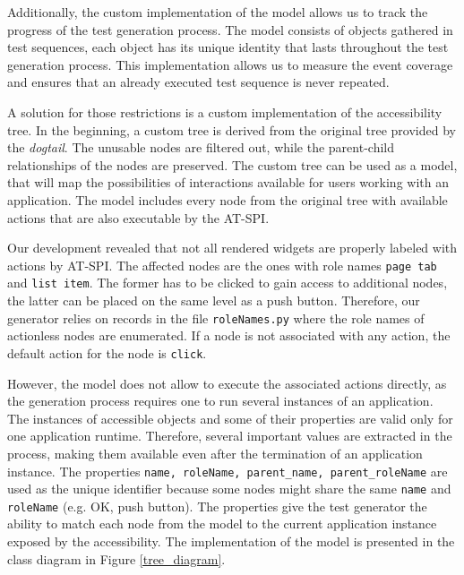 Additionally, the custom implementation of the model allows us to track the progress of the test generation process. The model consists of objects gathered in test sequences, each object has its unique identity that lasts throughout the test generation process. This implementation allows us to measure the event coverage and ensures that an already executed test sequence is never repeated.

A solution for those restrictions is a custom implementation of the accessibility tree. In the beginning, a custom tree is derived from the original tree provided by the \textit{dogtail}. The unusable nodes are filtered out, while the parent-child relationships of the nodes are preserved. The custom tree can be used as a model, that will map the possibilities of interactions available for users working with an application. The model includes every node from the original tree with available actions that are also executable by the AT-SPI.

Our development revealed that not all rendered widgets are properly labeled with actions by AT-SPI. The affected nodes are the ones with role names \texttt{page tab} and \texttt{list item}. The former has to be clicked to gain access to additional nodes, the latter can be placed on the same level as a push button. Therefore, our generator relies on records in the file \texttt{roleNames.py} where the role names of actionless nodes are enumerated. If a node is not associated with any action, the default action for the node is \texttt{click}.

However, the model does not allow to execute the associated actions directly, as the generation process requires one to run several instances of an application. The instances of accessible objects and some of their properties are valid only for one application runtime. Therefore, several important values are extracted in the process, making them available even after the termination of an application instance. The properties \texttt{name, roleName, parent\_name, parent\_roleName} are used as the unique identifier because some nodes might share the same \texttt{name} and \texttt{roleName} (e.g. OK, push button). The properties give the test generator the ability to match each node from the model to the current application instance exposed by the accessibility. The implementation of the model is presented in the class diagram in Figure \ref{tree_diagram}.

